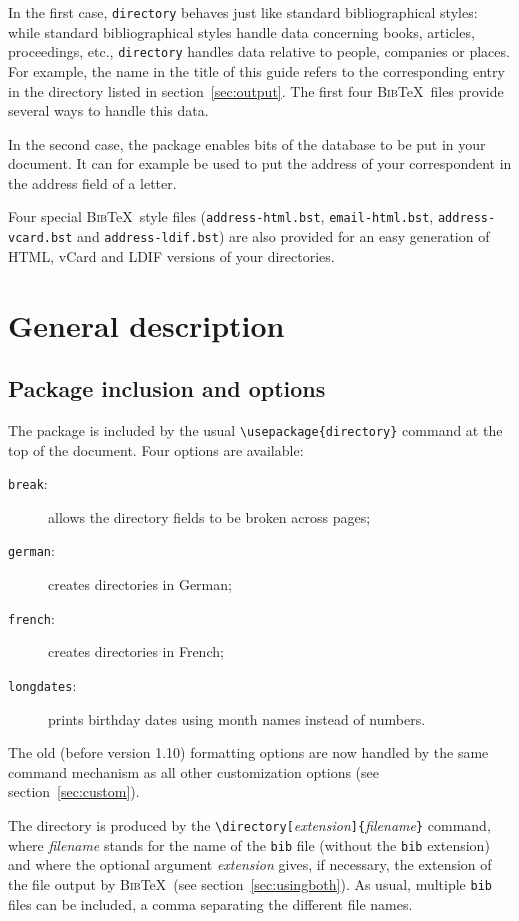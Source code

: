 \documentclass[10pt]{article}
\newcommand{\BibTeX}{\textsc{Bib}\TeX}
\begin{document}
In the first case, \texttt{directory} behaves just like standard
bibliographical styles: while standard bibliographical styles handle data
concerning books, articles, proceedings, etc., \texttt{directory} handles
data relative to people, companies or places. For example, the name in the
title of this guide refers to the corresponding entry in the directory
listed in section~\ref{sec:output}. The first four \BibTeX\ files provide
several ways to handle this data.

In the second case, the package enables bits of the database to be put in your
document. It can for example be used to put the address of your correspondent
in the address field of a letter.

\sloppypar
Four special \BibTeX\ style files (\texttt{address-html.bst},
\texttt{email-html.bst}, \texttt{address-vcard.bst} and
\texttt{address-ldif.bst}) are also provided for an easy generation of HTML,
vCard and LDIF versions of your directories.

\section{General description}

\subsection{Package inclusion and options}

The package is included by the usual \verb'\usepackage{directory}' command
at the top of the document. Four options are available:
\begin{description}
\item[\textmd{\texttt{break}:}] allows the directory fields to be broken
across pages;
\item[\textmd{\texttt{german}:}] creates directories in German;
\item[\textmd{\texttt{french}:}] creates directories in French;
\item[\textmd{\texttt{longdates}:}] prints birthday dates using month names
instead of numbers.
\end{description}
The old (before version 1.10) formatting options are now handled by the same
command mechanism as all other customization options (see
section~\ref{sec:custom}).

The directory is produced by the
\verb'\directory['\emph{extension}\verb']{'\emph{filename}\verb'}' command,
where \emph{filename} stands for the name of the \texttt{bib} file (without
the \texttt{bib} extension) and where the optional argument \emph{extension}
gives, if necessary, the extension of the file output by \BibTeX\ (see
section~\ref{sec:usingboth}). As usual, multiple \texttt{bib} files can be
included, a comma separating the different file names.
\end{document}
